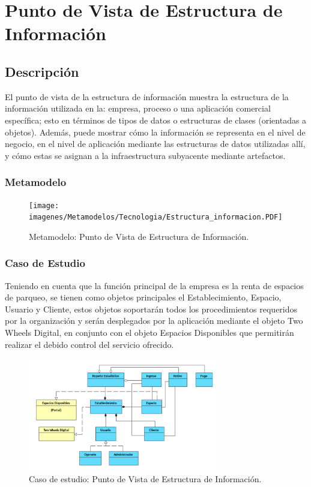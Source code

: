 \section{Punto de Vista de Estructura de Información}
\subsection{Descripción}
El punto de vista de la estructura de información muestra la estructura de la información utilizada en la: empresa, proceso o una aplicación comercial específica; esto en términos de tipos de datos o estructuras de clases (orientadas a objetos). Además, puede mostrar cómo la información se representa en el nivel de negocio, en el nivel de aplicación mediante las estructuras de datos utilizadas allí, y cómo estas se asignan a la infraestructura subyacente mediante artefactos.

\subsubsection{Metamodelo}
\begin{figure}[h]
	\centering
	\texttt{[image: imagenes/Metamodelos/Tecnologia/Estructura\_informacion.PDF]}
	\caption{Metamodelo: Punto de Vista de Estructura de Información.}
	\label{fig:gap_analysis}
\end{figure}

\subsubsection{Caso de Estudio}
Teniendo en cuenta que la función principal de la empresa es la renta de espacios de parqueo, se tienen como objetos principales el Establecimiento, Espacio, Usuario y Cliente, estos objetos soportarán todos los procedimientos requeridos por la organización y serán desplegados por la aplicación mediante el objeto Two Wheels Digital, en conjunto con el objeto Espacios Disponibles que permitirán realizar el debido control del servicio ofrecido.

\begin{figure}[h]
	\centering
	\includegraphics[width=0.75\textwidth]{imagenes/Caso_Estudio/Tecnologia/estructura_informacion.PDF}
	\caption{Caso de estudio: Punto de Vista de Estructura de Información.}
	\label{fig:gap_analysis}
\end{figure}


